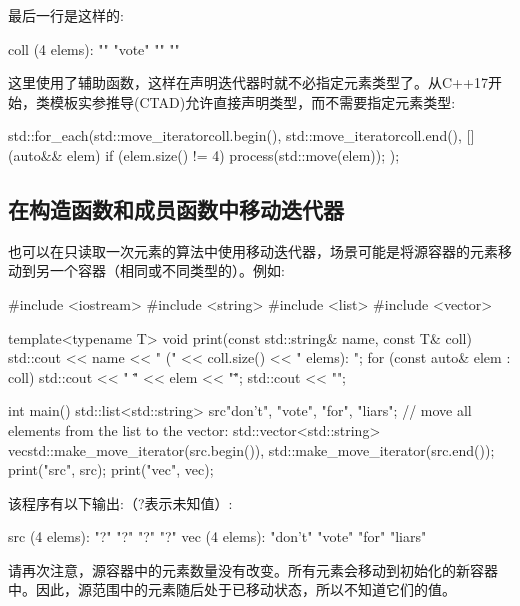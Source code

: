 最后一行是这样的:

\begin{outputcode}
coll (4 elems): "" "vote" "" ""
\end{outputcode}

这里使用了辅助函数，这样在声明迭代器时就不必指定元素类型了。从C++17开始，类模板实参推导(CTAD)允许直接声明类型，而不需要指定元素类型:

\begin{cppcode}
std::for_each(std::move_iterator{coll.begin()},
std::move_iterator{coll.end()},
[] (auto&& elem) {
	if (elem.size() != 4) {
		process(std::move(elem));
	}
});
\end{cppcode}

\subsection{在构造函数和成员函数中移动迭代器}

也可以在只读取一次元素的算法中使用移动迭代器，场景可能是将源容器的元素移动到另一个容器（相同或不同类型的）。例如:

\begin{cppcode}
#include <iostream>
#include <string>
#include <list>
#include <vector>

template<typename T>
void print(const std::string& name, const T& coll)
{
	std::cout << name << " (" << coll.size() << " elems): ";
	for (const auto& elem : coll) {
		std::cout << " \"" << elem << "\"";
	}
	std::cout << "\n";
}

int main()
{
	std::list<std::string> src{"don't", "vote", "for", "liars"};
	// move all elements from the list to the vector:
	std::vector<std::string> vec{std::make_move_iterator(src.begin()),
		std::make_move_iterator(src.end())};
	print("src", src);
	print("vec", vec);
}
\end{cppcode}

该程序有以下输出:（?表示未知值）:

\begin{outputcode}
src (4 elems): "?" "?" "?" "?"
vec (4 elems): "don't" "vote" "for" "liars"
\end{outputcode}

请再次注意，源容器中的元素数量没有改变。所有元素会移动到初始化的新容器中。因此，源范围中的元素随后处于已移动状态，所以不知道它们的值。













